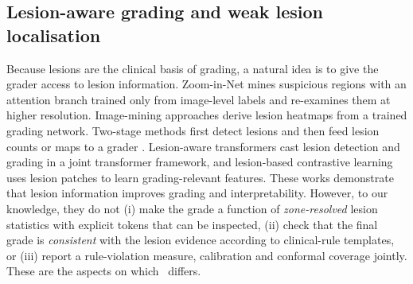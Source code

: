 \subsection{Lesion-aware grading and weak lesion localisation}
Because lesions are the clinical basis of grading, a natural idea is to give the grader access to lesion information. Zoom-in-Net \citep{wang2017zoomin} mines suspicious regions with an attention branch trained only from image-level labels and re-examines them at higher resolution. Image-mining approaches \citep{quellec2017} derive lesion heatmaps from a trained grading network. Two-stage methods first detect lesions and then feed lesion counts or maps to a grader \citep{yang2017twostage}. Lesion-aware transformers \citep{sun2021lat} cast lesion detection and grading in a joint transformer framework, and lesion-based contrastive learning \citep{huang2021lesioncl} uses lesion patches to learn grading-relevant features. These works demonstrate that lesion information improves grading and interpretability. However, to our knowledge, they do not (i) make the grade a function of \emph{zone-resolved} lesion statistics with explicit tokens that can be inspected, (ii) check that the final grade is \emph{consistent} with the lesion evidence according to clinical-rule templates, or (iii) report a rule-violation measure, calibration and conformal coverage jointly. These are the aspects on which \mname\ differs.

